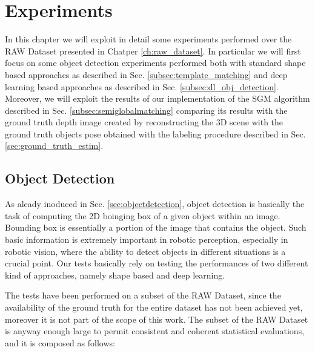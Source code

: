 \chapter{Experiments}\label{ch:experiments}
In this chapter we will exploit in detail some experiments performed over the RAW Dataset presented in Chatper \ref{ch:raw_dataset}. In particular we will first focus on some object detection experiments performed both with standard shape based approaches as described in Sec. \ref{subsec:template_matching} and deep learning based approaches as described in Sec. \ref{subsec:dl_obj_detection}. Moreover, we will exploit the results of our implementation of the SGM algorithm described in Sec. \ref{subsec:semiglobalmatching} comparing its results with the ground truth depth image created by reconstructing the 3D scene with the ground truth objects pose obtained with the labeling procedure described in Sec. \ref{sec:ground_truth_estim}.


\section{Object Detection}\label{sec:exp_object_detection}
As aleady inoduced in Sec. \ref{sec:objectdetection}, object detection is basically the task of computing the 2D boinging box of a given object within an image. Bounding box is essentially a portion of the image that contains the object. Such basic information is extremely important in robotic perception, especially in robotic vision, where the ability to detect objects in different situations is a crucial point. Our tests basically rely on testing the performances of two different kind of approaches, namely shape based and deep learning.

The tests have been performed on a subset of the RAW Dataset, since the availability of the ground truth for the entire dataset has not been achieved yet, moreover it is not part of the scope of this work. The subset of the RAW Dataset is anyway enough large to permit consistent and coherent statistical evaluations, and it is composed as follows:

